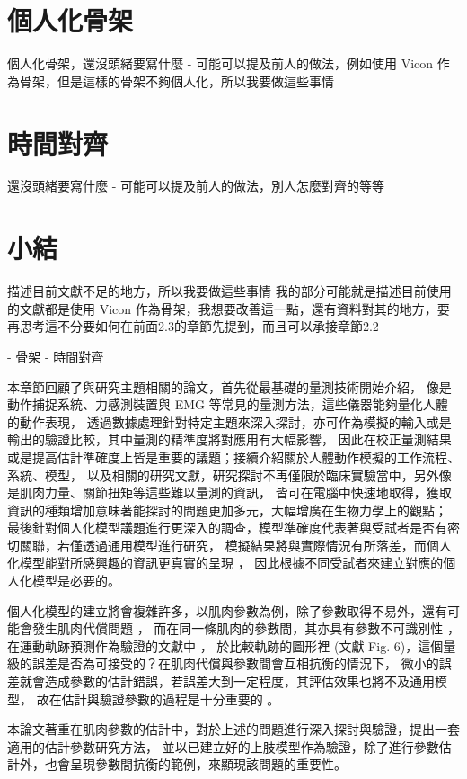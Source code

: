 \section{個人化骨架}
個人化骨架，還沒頭緒要寫什麼
- 可能可以提及前人的做法，例如使用 Vicon 作為骨架，但是這樣的骨架不夠個人化，所以我要做這些事情

\section{時間對齊}
還沒頭緒要寫什麼
- 可能可以提及前人的做法，別人怎麼對齊的等等

\section{小結}
描述目前文獻不足的地方，所以我要做這些事情
我的部分可能就是描述目前使用的文獻都是使用 Vicon 作為骨架，我想要改善這一點，還有資料對其的地方，要再思考這不分要如何在前面2.3的章節先提到，而且可以承接章節2.2

- 骨架
- 時間對齊

本章節回顧了與研究主題相關的論文，首先從最基礎的量測技術開始介紹，
像是動作捕捉系統、力感測裝置與 EMG 等常見的量測方法，這些儀器能夠量化人體的動作表現，
透過數據處理針對特定主題來深入探討，亦可作為模擬的輸入或是輸出的驗證比較，其中量測的精準度將對應用有大幅影響，
因此在校正量測結果或是提高估計準確度上皆是重要的議題；接續介紹關於人體動作模擬的工作流程、系統、模型，
以及相關的研究文獻，研究探討不再僅限於臨床實驗當中，另外像是肌肉力量、關節扭矩等這些難以量測的資訊，
皆可在電腦中快速地取得，獲取資訊的種類增加意味著能探討的問題更加多元，大幅增廣在生物力學上的觀點；
最後針對個人化模型議題進行更深入的調查，模型準確度代表著與受試者是否有密切關聯，若僅透過通用模型進行研究，
模擬結果將與實際情況有所落差，而個人化模型能對所感興趣的資訊更真實的呈現 \cite{akhundov2022subject}，
因此根據不同受試者來建立對應的個人化模型是必要的。

個人化模型的建立將會複雜許多，以肌肉參數為例，除了參數取得不易外，還有可能會發生肌肉代償問題 \cite{xiao2010sensitivity}，
而在同一條肌肉的參數間，其亦具有參數不可識別性 \cite{bujalski2018monte}，在運動軌跡預測作為驗證的文獻中 \cite{hinson2022sensitivity}，
於比較軌跡的圖形裡 (文獻 Fig. 6)，這個量級的誤差是否為可接受的？在肌肉代償與參數間會互相抗衡的情況下，
微小的誤差就會造成參數的估計錯誤，若誤差大到一定程度，其評估效果也將不及通用模型，
故在估計與驗證參數的過程是十分重要的 \cite{hicks2015my}。

本論文著重在肌肉參數的估計中，對於上述的問題進行深入探討與驗證，提出一套適用的估計參數研究方法，
並以已建立好的上肢模型作為驗證，除了進行參數估計外，也會呈現參數間抗衡的範例，來顯現該問題的重要性。

\clearpage